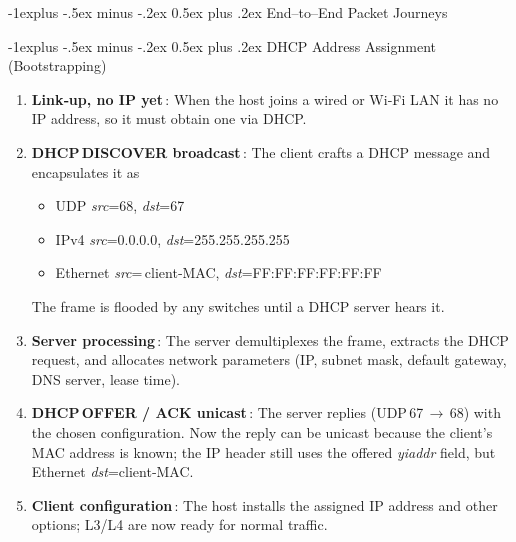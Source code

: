 \documentclass[letterpaper, 8pt]{extarticle}
\makeatletter
\renewcommand{\section}{\@startsection{section}{1}{0mm}%
                                {-1explus -.5ex minus -.2ex}%
                                {0.5ex plus .2ex}%
                                {\normalfont\normalsize\bfseries}}
\renewcommand{\subsection}{\@startsection{subsection}{2}{0mm}%
                                {-1explus -.5ex minus -.2ex}%
                                {0.5ex plus .2ex}%
                                {\normalfont\small\bfseries}}
\makeatother
\begin{document}
\begin{multicols*}{4}
	\section{End–to–End Packet Journeys}

	\subsection{DHCP Address Assignment (Bootstrapping)}
	\begin{enumerate}
		\item \textbf{Link‑up, no IP yet}\,:
		      When the host joins a wired or Wi‑Fi LAN it has no IP address, so it must obtain one via DHCP.
		\item \textbf{DHCP\,DISCOVER broadcast}\,:
		      The client crafts a DHCP message and encapsulates it as
		      \begin{itemize}
			      \item UDP \emph{src}=68, \emph{dst}=67
			      \item IPv4 \emph{src}=0.0.0.0, \emph{dst}=255.255.255.255
			      \item Ethernet \emph{src}=\,client‑MAC, \emph{dst}=FF:FF:FF:FF:FF:FF
		      \end{itemize}
		      The frame is flooded by any switches until a DHCP server hears it.
		\item \textbf{Server processing}\,:
		      The server demultiplexes the frame, extracts the DHCP request, and allocates network parameters
		      (IP, subnet mask, default gateway, DNS server, lease time).
		\item \textbf{DHCP\,OFFER / ACK unicast}\,:
		      The server replies (UDP\,67\,$\to$\,68) with the chosen configuration.
		      Now the reply can be unicast because the client’s MAC address is known; the IP header still uses
		      the offered \emph{yiaddr} field, but Ethernet \emph{dst}=client‑MAC.
		\item \textbf{Client configuration}\,:
		      The host installs the assigned IP address and other options; L3/L4 are now ready for normal traffic.
	\end{enumerate}


\end{multicols*}
\end{document}

